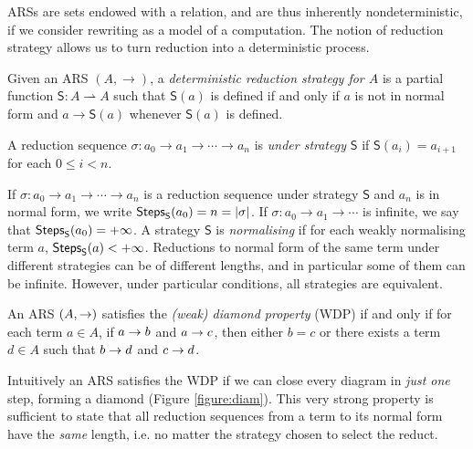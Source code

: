 ARSs are sets endowed with a relation, and are thus
inherently nondeterministic, if we consider rewriting as a model of a computation. The notion of reduction strategy allows us to turn reduction into a deterministic process.
\begin{definition}\label{def:determstrat}
	Given an ARS $(A,\rightarrow)$, a \emph{deterministic reduction
		strategy for $A$} is a partial function $\mathsf{S}:A\rightharpoonup A$
	such that $\mathsf{S}(a)$ is defined if and only if $a$ is not in
	normal form and $a\rightarrow\mathsf{S}(a)$ whenever $\mathsf{S}(a)$
	is defined.
\end{definition}
\begin{definition}
	A reduction sequence $\sigma:a_0\rightarrow a_1\rightarrow\cdots\rightarrow a_n$ is \emph{under strategy} $\mathsf{S}$ if $\mathsf{S}(a_i)=a_{i+1}$ for each $0\leq i<n$.
\end{definition}
If $\sigma:a_0\rightarrow a_1\rightarrow\cdots\rightarrow a_n$ is a
reduction sequence under strategy $\mathsf{S}$ and $a_n$ is in normal
form, we write $\textsf{Steps}_{\mathsf{S}}(a_0)=n=|\sigma|$. If
$\sigma:a_0\rightarrow a_1\rightarrow\cdots$ is infinite, we say that
$\textsf{Steps}_{\mathsf{S}}(a_0)=+\infty$. A strategy $\mathsf{S}$ is \emph{normalising} if for each weakly normalising term $a$, $\textsf{Steps}_{\mathsf{S}}(a)<+\infty$. Reductions to normal form of the same term under different strategies can be of different lengths, and in particular some of them can be infinite. However, under particular conditions, all strategies are equivalent.
\begin{definition}
	An ARS $(A,\rightarrow)$ satisfies the \emph{(weak) diamond property} (WDP) if and only if for each term $a\in A$, if $a\rightarrow b$ and $a\rightarrow c$, then either $b=c$ or there exists a term $d\in A$ such that $b\rightarrow d$ and $c\rightarrow d$. 
\end{definition}
Intuitively an ARS satisfies the WDP if we can close every diagram in \emph{just one} step, forming a diamond (Figure \ref{figure:diam}). This very strong property is sufficient to state that all reduction sequences from a term to its normal form have the \emph{same} length, i.e. no matter the strategy chosen to select the reduct.
